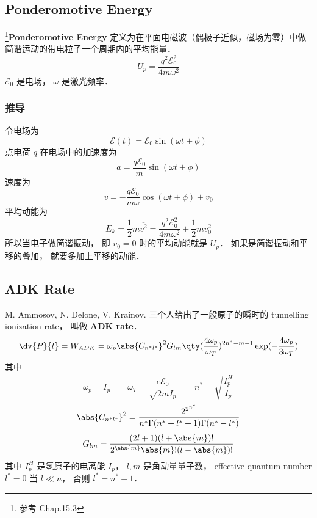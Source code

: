 
\begin{issues}
\issueDraft
\end{issues}

\subsection{Ponderomotive Energy}
\footnote{参考 \cite{Brandsen} Chap.15.3}\textbf{Ponderomotive Energy} 定义为在平面电磁波（偶极子近似，磁场为零）中做简谐运动的带电粒子一个周期内的平均能量．
\begin{equation}
U_p = \frac{q^2 \mathcal E_0^2}{4m\omega^2}
\end{equation}
$\mathcal E_0$ 是电场， $\omega$ 是激光频率．

\subsubsection{推导}
令电场为
\begin{equation}
\mathcal E(t) = \mathcal E_0 \sin(\omega t + \phi)
\end{equation}
点电荷 $q$ 在电场中的加速度为
\begin{equation}
a = \frac{q\mathcal E_0}{m} \sin(\omega t + \phi)
\end{equation}
速度为
\begin{equation}
v = -\frac{q\mathcal E_0}{m\omega} \cos(\omega t + \phi) + v_0
\end{equation}
平均动能为
\begin{equation}
\overline{E_k} = \frac{1}{2}m \overline{v^2} = \frac{q^2\mathcal E_0^2}{4m\omega^2} + \frac{1}{2}mv_0^2
\end{equation}
所以当电子做简谐振动， 即 $v_0 = 0$ 时的平均动能就是 $U_p$． 如果是简谐振动和平移的叠加， 就要多加上平移的动能．

\subsection{ADK Rate}
M. Ammosov, N. Delone, V. Krainov. 三个人给出了一般原子的瞬时的 tunnelling ionization rate， 叫做 \textbf{ADK rate}．
\begin{equation}
\dv{P}{t} = W_{ADK} = \omega_p \abs{C_{n^*l^*}}^2 G_{lm}\qty(\frac{4\omega_p}{\omega_T})^{2n^*-m-1}\exp(-\frac{4\omega_p}{3\omega_T})
\end{equation}
其中
\begin{equation}
\omega_p = I_p \qquad \omega_T = \frac{e\mathcal E_0}{\sqrt{2mI_p}} \qquad
n^* = \sqrt{\frac{I_p^H}{I_p}}
\end{equation}
\begin{equation}
\abs{C_{n^*l^*}}^2 = \frac{2^{2^{n^*}}}{n^* \Gamma(n^* + l^* + 1) \Gamma(n^* - l^*)}
\end{equation}
\begin{equation}
G_{lm} = \frac{(2l+1)(l+\abs{m})!}{2^{\abs{m}}\abs{m}!(l-\abs{m})!}
\end{equation}
其中 $I_p^H$ 是氢原子的电离能 $I_p$， $l,m$ 是角动量量子数， effective quantum number $l^* = 0$ 当 $l\ll n$， 否则 $l^* = n^*-1$．

